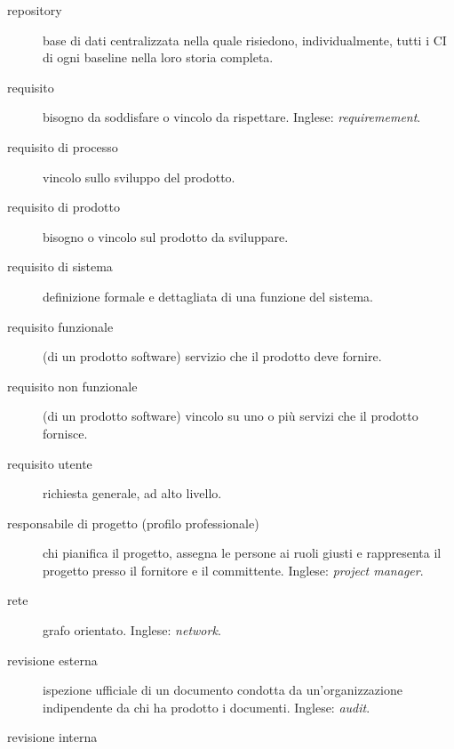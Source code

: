 \documentclass[a4paper]{article}
\begin{document}
\begin{description}
	\item[repository] 

			base di dati centralizzata nella quale risiedono, individualmente, tutti i CI di ogni baseline nella loro storia completa.
			
	\item[requisito] 

			bisogno da soddisfare o vincolo da rispettare. Inglese: \emph{requiremement}.
			
	\item[requisito di processo] 

			vincolo sullo sviluppo del prodotto.
			
	\item[requisito di prodotto] 

			bisogno o vincolo sul prodotto da sviluppare.
			
	\item[requisito di sistema] 

			definizione formale e dettagliata di una funzione del sistema.
			
	\item[requisito funzionale] 

			(di un prodotto software) servizio che il prodotto deve fornire.
			
	\item[requisito non funzionale] 

			(di un prodotto software) vincolo su uno o più servizi che il prodotto fornisce.
			
	\item[requisito utente] 

			richiesta generale, ad alto livello.
			
	\item[responsabile di progetto (profilo professionale)] 

			chi pianifica il progetto, assegna le persone ai ruoli giusti e rappresenta il progetto presso il fornitore e il committente. Inglese: \emph{project manager}.
			
	\item[rete] 

			grafo orientato. Inglese: \emph{network}.
			
	\item[revisione esterna] 

			ispezione ufficiale di un documento condotta da un'organizzazione indipendente da chi ha prodotto i documenti. Inglese: \emph{audit}.
			
	\item[revisione interna] 


\end{description}
\end{document}
